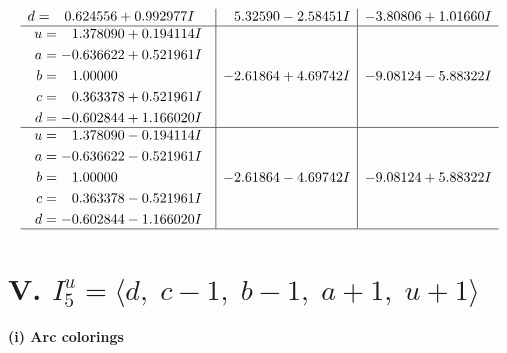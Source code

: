 \documentclass[1p]{elsarticle_modified}
\theoremstyle{definition}
\begin{document}
$$\begin{array}{c|c|c}
\begin{aligned}
d &= \phantom{-}0.624556 + 0.992977 I\end{aligned}
 & \phantom{-}5.32590 - 2.58451 I & -3.80806 + 1.01660 I \\ \hline\begin{aligned}
u &= \phantom{-}1.378090 + 0.194114 I \\
a &= -0.636622 + 0.521961 I \\
b &= \phantom{-}1.00000\phantom{ +0.000000I} \\
c &= \phantom{-}0.363378 + 0.521961 I \\
d &= -0.602844 + 1.166020 I\end{aligned}
 & -2.61864 + 4.69742 I & -9.08124 - 5.88322 I \\ \hline\begin{aligned}
u &= \phantom{-}1.378090 - 0.194114 I \\
a &= -0.636622 - 0.521961 I \\
b &= \phantom{-}1.00000\phantom{ +0.000000I} \\
c &= \phantom{-}0.363378 - 0.521961 I \\
d &= -0.602844 - 1.166020 I\end{aligned}
 & -2.61864 - 4.69742 I & -9.08124 + 5.88322 I\\
 \hline 
 \end{array}$$\newpage\newpage\renewcommand{\arraystretch}{1}
\centering \section*{V. $I^u_{5}= \langle d,\;c-1,\;b-1,\;a+1,\;u+1 \rangle$}
\flushleft \textbf{(i) Arc colorings}\\
\end{document}
